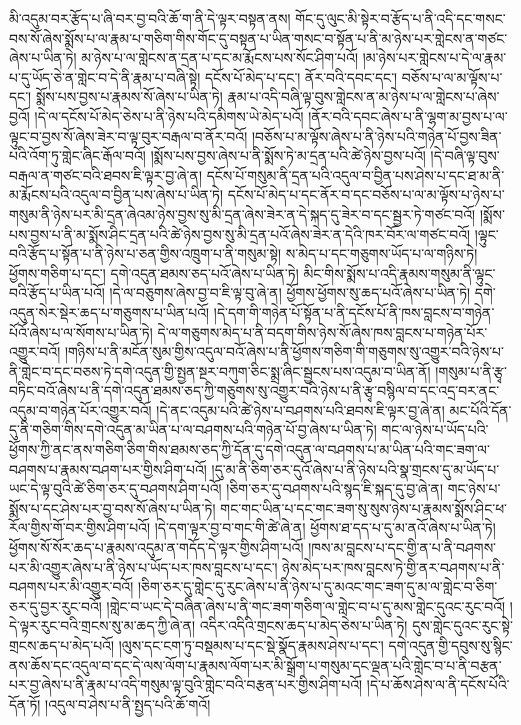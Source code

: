 མི་འདུམ་བར་རྩོད་པ་ཞི་བར་བྱ་བའི་ཆོ་ག་ནི་དེ་ལྟར་བསྟན་ནས། གོང་དུ་ལུང་མི་སྟེར་བ་རྩོད་པ་ནི་འདི་དང་གསང་བས་སོ་ཞེས་སྨོས་པ་ལ་རྣམ་པ་གཅིག་གིས་གོང་དུ་བསྟན་པ་ཡིན་གསང་བ་སྟོན་པ་ནི་མ་ཉེས་པར་གླེངས་ན་གཙང་ཞེས་པ་ཡིན་ཏེ། མ་ཉེས་པ་ལ་གླེངས་ན་དྲན་པ་དང་མ་རྨོངས་པས་སོང་ཤིག་པའོ། །མ་ཉེས་པར་གླེངས་པ་དེ་ལ་རྣམ་པ་དུ་ཡོད་ཅེ་ན་གླེང་བ་དེ་ནི་རྣམ་པ་བཞི་སྟེ། དངོས་པོ་མེད་པ་དང་། ནོར་བའི་དབང་དང་། བཅོས་པ་ལ་མ་ལྟོས་པ་དང་། སྨོས་པས་བྱས་པ་རྣམས་སོ་ཞེས་པ་ཡིན་ཏེ། རྣམ་པ་འདི་བཞི་ལྟ་བུས་གླེངས་ན་མ་ཉེས་པ་ལ་གླེངས་པ་ཞེས་བྱའོ། །དེ་ལ་དངོས་པོ་མེད་ཅེས་པ་ནི་ཉེས་པའི་དམིགས་ཡེ་མེད་པའོ། །ནོར་བའི་དབང་ཞེས་པ་ནི་ལྷག་མ་བྱས་པ་ལ་ལྟུང་བ་བྱས་སོ་ཞེས་ཟེར་བ་ལྟ་བུར་བརྒལ་བ་ནོར་བའོ། །བཅོས་པ་མ་ལྟོས་ཞེས་པ་ནི་ཉེས་པའི་གཉེན་པོ་བྱས་ཟིན་པའི་འོག་ཏུ་གླེང་ཞིང་རྒོལ་བའོ། །སྨོས་པས་བྱས་ཞེས་པ་ནི་སྨོས་ཏེ་མ་དྲན་པའི་ཚེ་ཉེས་བྱས་པའོ། །དེ་བཞི་ལྟ་བུས་བརྒལ་ན་གཙང་བའི་ཐབས་ཇི་ལྟར་བྱ་ཞེ་ན། དངོས་པོ་གསུམ་ནི་དྲན་པའི་འདུལ་བ་བྱིན་པས་ཤེས་པ་དང་ཐ་མ་ནི་མ་རྨོངས་པའི་འདུལ་བ་བྱིན་པས་ཞེས་པ་ཡིན་ཏེ། དངོས་པོ་མེད་པ་དང་ནོར་བ་དང་བཅོས་པ་ལ་མ་ལྟོས་པ་ཉེས་པ་གསུམ་ནི་ཉེས་པར་མི་དྲན་ཞེའམ་ཉེས་བྱས་སུ་མི་དྲན་ཞེས་ཟེར་ན་དེ་སྐད་དུ་ཟེར་བ་དང་སྦྱར་ཏེ་གཙང་བའོ། །སྨོས་པས་བྱས་པ་ནི་མ་སྨོས་ཤིང་དྲན་པའི་ཚེ་ཉེས་བྱས་སུ་མི་དྲན་པའོ་ཞེས་ཟེར་ན་དེའི་ཁར་བོར་ལ་གཙང་བའོ། །ལྟུང་བའི་རྩོད་པ་སྟོན་པ་ནི་ཉེས་པ་ཅན་གྱིས་འཁྲུག་པ་ནི་གསུམ་སྟེ། ས་མེད་པ་དང་གཅུགས་ཡོད་པ་ལ་གཉིས་ཏེ། ཕྱོགས་གཅིག་པ་དང་། དགེ་འདུན་ཐམས་ཅད་པའོ་ཞེས་པ་ཡིན་ཏེ། མིང་གིས་སྨོས་པ་འདི་རྣམས་གསུམ་ནི་ལྟུང་བའི་རྩོད་པ་ཡིན་པའོ། །དེ་ལ་བཅུགས་ཞེས་བྱ་བ་ཇི་ལྟ་བུ་ཞེ་ན། ཕྱོགས་ཕྱོགས་སུ་ཆད་པའོ་ཞེས་པ་ཡིན་ཏེ། དགེ་འདུན་སེར་སྡེར་ཆད་པ་གཅུགས་པ་ཡིན་པའོ། །དེ་དག་གི་གཉེན་པོ་སྟོན་པ་ནི་དངོས་པོ་ནི་ཁས་བླངས་བ་གཉེན་པོའོ་ཞེས་པ་ལ་སོགས་པ་ཡིན་ཏེ། དེ་ལ་གཅུགས་མེད་པ་ནི་བདག་གིས་ཉེས་སོ་ཞེས་ཁས་བླངས་པ་གཉེན་པོར་འགྱུར་བའོ། །གཉིས་པ་ནི་མངོན་སུམ་གྱིས་འདུལ་བའོ་ཞེས་པ་ནི་ཕྱོགས་གཅིག་གི་གཅུགས་སུ་འགྱུར་བའི་ཉེས་པ་ནི་གླེང་བ་དང་བཅས་ཏེ་དགེ་འདུན་གྱི་སྤྱན་སྔར་བཀུག་ཅིང་སྨྲ་ཞིང་སྦྱངས་པས་འདུམ་བ་ཡིན་ནོ། །གསུམ་པ་ནི་རྩྭ་བཏིང་བའོ་ཞེས་པ་ནི་དགེ་འདུན་ཐམས་ཅད་ཀྱི་གཅུགས་སུ་འགྱུར་བའི་ཉེས་པ་ནི་རྩྭ་བསྙིལ་བ་དང་འདྲ་བར་ནང་འདུམ་བ་གཉེན་པོར་འགྱུར་བའོ། །དེ་ནང་འདུམ་པའི་ཚེ་ཉེས་པ་བཤགས་པའི་ཐབས་ཇི་ལྟར་བྱ་ཞེ་ན། མང་པོའི་དོན་དུ་ནི་གཅིག་གིས་དགེ་འདུན་མ་ཡིན་པ་ལ་བཤགས་པའི་གཉེན་པོ་བྱ་ཞེས་པ་ཡིན་ཏེ། གང་ལ་ཉེས་པ་ཡོད་པའི་ཕྱོགས་ཀྱི་ནང་ནས་གཅིག་ཅིག་གིས་ཐམས་ཅད་ཀྱི་དོན་དུ་དགེ་འདུན་ལ་བཤགས་པ་མ་ཡིན་པའི་གང་ཟག་ལ་བཤགས་པ་རྣམས་བཤག་པར་གྱིས་ཤིག་པའོ། །དུ་མ་ནི་ཅིག་ཅར་དུའོ་ཞེས་པ་ནི་ཉེས་པའི་སྣ་གྲངས་དུ་མ་ཡོད་པ་ཡང་དེ་ལྟ་བུའི་ཚེ་ཅིག་ཅར་དུ་བཤགས་ཤིག་པའོ། །ཅིག་ཅར་དུ་བཤགས་པའི་སྙད་ཇི་སྐད་དུ་བྱ་ཞེ་ན། གང་ཉེས་པ་སྨོས་པ་དང་ཤེས་པར་བྱ་བས་སོ་ཞེས་པ་ཡིན་ཏེ། གང་གང་ཡིན་པ་དང་གང་ཟག་སུ་སུས་ཉེས་པ་རྣམས་སྨོས་ཤིང་ཕ་རོལ་གྱིས་གོ་བར་གྱིས་ཤིག་པའོ། །དེ་དག་ལྟར་བྱ་བ་གང་གི་ཚེ་ཞེ་ན། ཕྱོགས་ཐ་དད་པ་དུ་མ་ནའོ་ཞེས་པ་ཡིན་ཏེ། ཕྱོགས་སོ་སོར་ཆད་པ་རྣམས་འདུམ་ན་གདོད་དེ་ལྟར་གྱིས་ཤིག་པའོ། །ཁས་མ་བླངས་པ་དང་གྱི་ན་པ་ནི་བཤགས་པར་མི་འགྱུར་ཞེས་པ་ནི་ཉེས་པ་ཡོད་པར་ཁས་བླངས་པ་དང་། ཉེས་མེད་པར་ཁས་བླངས་ཏེ་གྱི་ནར་བཤགས་པ་ནི་བཤགས་པར་མི་འགྱུར་བའོ། །ཅིག་ཅར་དུ་གླེང་དུ་རུང་ཞེས་པ་ནི་ཉེས་པ་དུ་མའང་གང་ཟག་དུ་མ་ལ་གླེང་བ་ཅིག་ཅར་དུ་བྱར་རུང་བའོ། །གླེང་བ་ཡང་དེ་བཞིན་ཞེས་པ་ནི་གང་ཟག་གཅིག་ལ་གླེང་བ་པ་དུ་མས་གླེང་དུའང་རུང་བའོ། །དེ་ལྟར་རུང་བའི་གྲངས་སུ་མ་ཆད་ཀྱི་ཞེ་ན། འདིར་འདིའི་གྲངས་ཆད་པ་མེད་ཅེས་པ་ཡིན་ཏེ། དུས་གླེང་དུའང་རུང་སྟེ་གྲངས་ཆད་པ་མེད་པའོ། །ལུས་དང་ངག་ཏུ་བསྡམས་པ་དང་སྡེ་སྣོད་རྣམས་ཤེས་པ་དང་། དགེ་འདུན་གྱི་དབུས་སུ་སྙིང་ནས་ཆོས་དང་འདུལ་བ་དང་དེ་ལས་ལོག་པ་རྣམས་ལོག་པར་མི་སྒྲོག་པ་གསུམ་དང་ལྡན་པའི་གླེང་བ་པ་ནི་བརྩན་པར་བྱ་ཞེས་པ་ནི་རྣམ་པ་འདི་གསུམ་ལྟ་བུའི་གླེང་བའི་བརྩན་པར་གྱིས་ཤིག་པའོ། །དེ་པ་ཆོས་ཤེས་ལ་ནི་དངོས་པོའི་དོན་ཏོ། །འདུལ་བ་ཤེས་པ་ནི་སྤྱད་པའི་ཆོ་གའོ། 